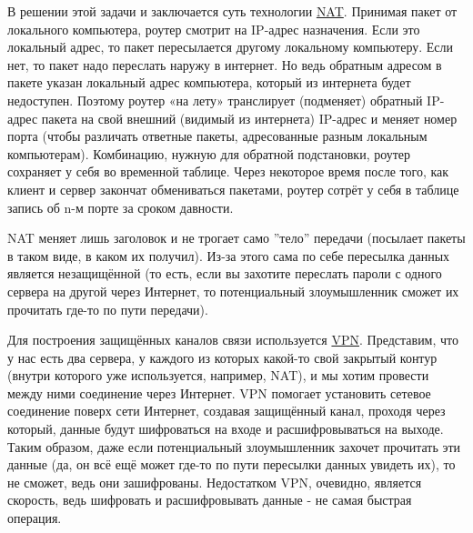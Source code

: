 В решении этой задачи и заключается суть технологии \href{https://ru.wikipedia.org/wiki/NAT}{NAT}. Принимая пакет от локального компьютера, роутер смотрит на IP-адрес назначения. Если это локальный адрес, то пакет пересылается другому локальному компьютеру. Если нет, то пакет надо переслать наружу в интернет. Но ведь обратным адресом в пакете указан локальный адрес компьютера, который из интернета будет недоступен. Поэтому роутер «на лету» транслирует (подменяет) обратный IP-адрес пакета на свой внешний (видимый из интернета) IP-адрес и меняет номер порта (чтобы различать ответные пакеты, адресованные разным локальным компьютерам). Комбинацию, нужную для обратной подстановки, роутер сохраняет у себя во временной таблице. Через некоторое время после того, как клиент и сервер закончат обмениваться пакетами, роутер сотрёт у себя в таблице запись об n-м порте за сроком давности.

NAT меняет лишь заголовок и не трогает само ''тело'' передачи (посылает пакеты в таком виде, в каком их получил). Из-за этого сама по себе пересылка данных является незащищённой (то есть, если вы захотите переслать пароли с одного сервера на другой через Интернет, то потенциальный злоумышленник сможет их прочитать где-то по пути передачи).

\bigskip    
Для построения защищённых каналов связи используется \href{https://ru.wikipedia.org/wiki/VPN}{VPN}. Представим, что у нас есть два сервера, у каждого из которых какой-то свой закрытый контур (внутри которого уже используется, например, NAT), и мы хотим провести между ними соединение через Интернет. VPN помогает установить сетевое соединение поверх сети Интернет, создавая защищённый канал, проходя через который, данные будут шифроваться на входе и расшифровываться на выходе.
Таким образом, даже если потенциальный злоумышленник захочет прочитать эти данные (да, он всё ещё может где-то по пути пересылки данных увидеть их), то не сможет, ведь они зашифрованы. Недостатком VPN, очевидно, является скорость, ведь шифровать и расшифровывать данные - не самая быстрая операция.